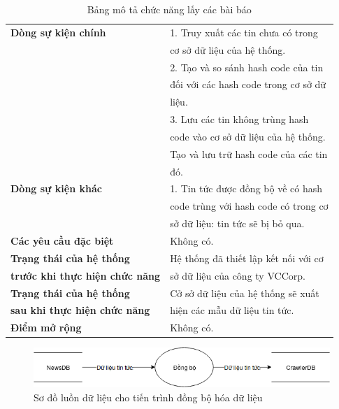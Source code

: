\begin{table}[H]
\begin{tabular}{ll}
      \textbf{Dòng sự kiện chính}
                                  & 1. Truy xuất các tin chưa có trong \\
                                  & cơ sở dữ liệu của hệ thống.\\
                                  & 2. Tạo và so sánh hash code của tin \\
                                  & đối với các hash code trong cơ sở dữ\\
                                  & liệu. \\
                                  & 3. Lưu các tin không trùng hash\\ 
                                  & code vào cơ sở dữ liệu của hệ thống.\\
                                  & Tạo và lưu trữ hash code của các tin \\
                                  & đó.\\ \midrule
      \textbf{Dòng sự kiện khác} & 1. Tin tức được đồng bộ về có hash \\
                                 & code trùng với hash code có trong cơ \\
                                 & sở dữ liệu: tin tức sẽ bị bỏ qua.\\ \midrule
      \textbf{Các yêu cầu đặc biệt} & Không có. \\ \midrule
      \textbf{Trạng thái của hệ thống} & Hệ thống đã thiết lập kết nối với cơ\\ 
      \textbf{trước khi thực hiện chức năng} & sở dữ liệu của công ty VCCorp. \\ \midrule
      \textbf{Trạng thái của hệ thống} & Cở sở dữ liệu của hệ thống sẽ xuất \\
      \textbf{sau khi thực hiện chức năng} & hiện các mẫu dữ liệu tin tức. \\ \midrule
      \textbf{Điểm mở rộng} & Không có. \\ \bottomrule
    \end{tabular}
    \caption{Bảng mô tả chức năng lấy các bài báo}
  \end{table}
\begin{figure}[H]
	\centering
	\includegraphics[width=0.9\linewidth]{Chapter3/Chapter3Figs/Crawler.png}
	\caption{Sơ đồ luồn dữ liệu cho tiến trình đồng bộ hóa dữ liệu}
	\label{fig:classifyprocess}
\end{figure}
